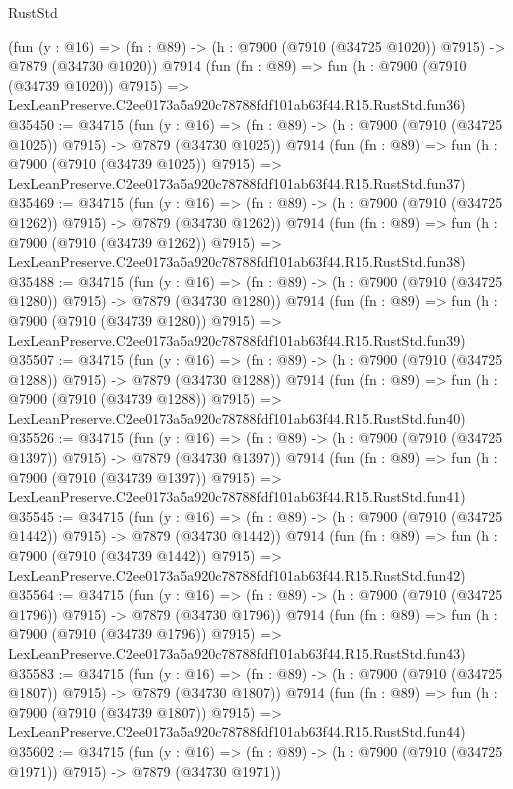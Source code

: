 \begin{lexlean}{RustStd}
\begin{coremodule}
    (fun (y : @16) =>
    (fn : @89) -> (h : @7900 (@7910 (@34725 @1020)) @7915) -> @7879 (@34730 @1020))
    @7914
    (fun (fn : @89) =>
    fun (h : @7900 (@7910 (@34739 @1020)) @7915) =>
    LexLeanPreserve.C2ee0173a5a920c78788fdf101ab63f44.R15.RustStd.fun36)
@35450 := @34715
    (fun (y : @16) =>
    (fn : @89) -> (h : @7900 (@7910 (@34725 @1025)) @7915) -> @7879 (@34730 @1025))
    @7914
    (fun (fn : @89) =>
    fun (h : @7900 (@7910 (@34739 @1025)) @7915) =>
    LexLeanPreserve.C2ee0173a5a920c78788fdf101ab63f44.R15.RustStd.fun37)
@35469 := @34715
    (fun (y : @16) =>
    (fn : @89) -> (h : @7900 (@7910 (@34725 @1262)) @7915) -> @7879 (@34730 @1262))
    @7914
    (fun (fn : @89) =>
    fun (h : @7900 (@7910 (@34739 @1262)) @7915) =>
    LexLeanPreserve.C2ee0173a5a920c78788fdf101ab63f44.R15.RustStd.fun38)
@35488 := @34715
    (fun (y : @16) =>
    (fn : @89) -> (h : @7900 (@7910 (@34725 @1280)) @7915) -> @7879 (@34730 @1280))
    @7914
    (fun (fn : @89) =>
    fun (h : @7900 (@7910 (@34739 @1280)) @7915) =>
    LexLeanPreserve.C2ee0173a5a920c78788fdf101ab63f44.R15.RustStd.fun39)
@35507 := @34715
    (fun (y : @16) =>
    (fn : @89) -> (h : @7900 (@7910 (@34725 @1288)) @7915) -> @7879 (@34730 @1288))
    @7914
    (fun (fn : @89) =>
    fun (h : @7900 (@7910 (@34739 @1288)) @7915) =>
    LexLeanPreserve.C2ee0173a5a920c78788fdf101ab63f44.R15.RustStd.fun40)
@35526 := @34715
    (fun (y : @16) =>
    (fn : @89) -> (h : @7900 (@7910 (@34725 @1397)) @7915) -> @7879 (@34730 @1397))
    @7914
    (fun (fn : @89) =>
    fun (h : @7900 (@7910 (@34739 @1397)) @7915) =>
    LexLeanPreserve.C2ee0173a5a920c78788fdf101ab63f44.R15.RustStd.fun41)
@35545 := @34715
    (fun (y : @16) =>
    (fn : @89) -> (h : @7900 (@7910 (@34725 @1442)) @7915) -> @7879 (@34730 @1442))
    @7914
    (fun (fn : @89) =>
    fun (h : @7900 (@7910 (@34739 @1442)) @7915) =>
    LexLeanPreserve.C2ee0173a5a920c78788fdf101ab63f44.R15.RustStd.fun42)
@35564 := @34715
    (fun (y : @16) =>
    (fn : @89) -> (h : @7900 (@7910 (@34725 @1796)) @7915) -> @7879 (@34730 @1796))
    @7914
    (fun (fn : @89) =>
    fun (h : @7900 (@7910 (@34739 @1796)) @7915) =>
    LexLeanPreserve.C2ee0173a5a920c78788fdf101ab63f44.R15.RustStd.fun43)
@35583 := @34715
    (fun (y : @16) =>
    (fn : @89) -> (h : @7900 (@7910 (@34725 @1807)) @7915) -> @7879 (@34730 @1807))
    @7914
    (fun (fn : @89) =>
    fun (h : @7900 (@7910 (@34739 @1807)) @7915) =>
    LexLeanPreserve.C2ee0173a5a920c78788fdf101ab63f44.R15.RustStd.fun44)
@35602 := @34715
    (fun (y : @16) =>
    (fn : @89) -> (h : @7900 (@7910 (@34725 @1971)) @7915) -> @7879 (@34730 @1971))

\end{coremodule}
\end{lexlean}
